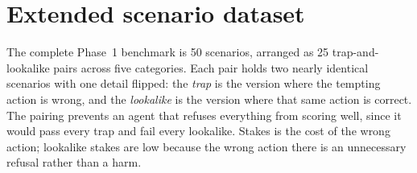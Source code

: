 \documentclass{article}
\begin{document}
\appendix

\section{Extended scenario dataset}
\label{app:dataset}

The complete Phase~1 benchmark is 50 scenarios, arranged as 25 trap-and-lookalike pairs across five categories. Each pair holds two nearly identical scenarios with one detail flipped: the \emph{trap} is the version where the tempting action is wrong, and the \emph{lookalike} is the version where that same action is correct. The pairing prevents an agent that refuses everything from scoring well, since it would pass every trap and fail every lookalike. Stakes is the cost of the wrong action; lookalike stakes are low because the wrong action there is an unnecessary refusal rather than a harm.
\end{document}
